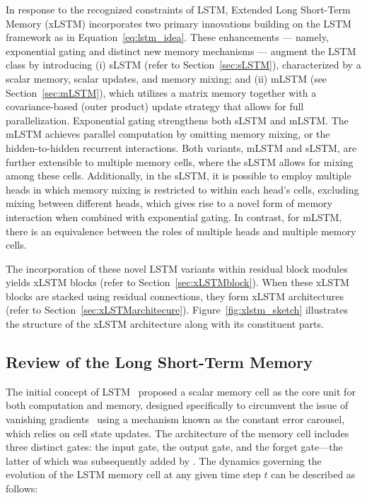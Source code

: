 In response to the recognized constraints of LSTM, Extended Long Short-Term Memory (xLSTM) incorporates two primary innovations building on the LSTM framework as in Equation~\eqref{eq:lstm_idea}. These enhancements --- namely, exponential gating and distinct new memory mechanisms --- augment the LSTM class by introducing (i) sLSTM (refer to Section~\ref{sec:sLSTM}), characterized by a scalar memory, scalar updates, and memory mixing; and (ii) mLSTM (see Section~\ref{sec:mLSTM}), which utilizes a matrix memory together with a covariance-based (outer product) update strategy that allows for full parallelization. Exponential gating strengthens both sLSTM and mLSTM. The mLSTM achieves parallel computation by omitting memory mixing, or the hidden-to-hidden recurrent interactions. Both variants, mLSTM and sLSTM, are further extensible to multiple memory cells, where the sLSTM allows for mixing among these cells. Additionally, in the sLSTM, it is possible to employ multiple heads in which memory mixing is restricted to within each head’s cells, excluding mixing between different heads, which gives rise to a novel form of memory interaction when combined with exponential gating. In contrast, for mLSTM, there is an equivalence between the roles of multiple heads and multiple memory cells.

The incorporation of these novel LSTM variants within residual block modules yields xLSTM blocks (refer to Section~\ref{sec:xLSTMblock}). When these xLSTM blocks are stacked using residual connections, they form xLSTM architectures (refer to Section~\ref{sec:xLSTMarchitecure}). Figure~\ref{fig:xlstm_sketch} illustrates the structure of the xLSTM architecture along with its constituent parts.

\subsection{Review of the Long Short-Term Memory}
\label{sec:orgLSTM}

The initial concept of LSTM~\citep{Hochreiter:91,Hochreiter:97nips,Hochreiter:97} proposed a scalar memory cell as the core unit for both computation and memory, designed specifically to circumvent the issue of vanishing gradients~\citep{Hochreiter:91,Hochreiter:00book} using a mechanism known as the constant error carousel, which relies on cell state updates. The architecture of the memory cell includes three distinct gates: the input gate, the output gate, and the forget gate—the latter of which was subsequently added by \citet{Gers:00}. The dynamics governing the evolution of the LSTM memory cell at any given time step $t$ can be described as follows:

